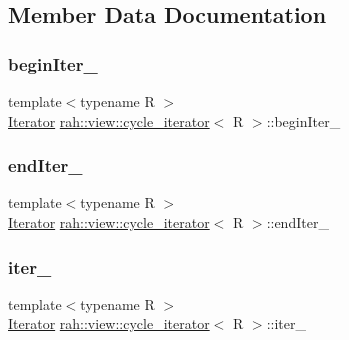 \subsection{Member Data Documentation}
\mbox{\label{structrah_1_1view_1_1cycle__iterator_a1daddc1b5ce6e1203aecb236a04d11d6}} 
\subsubsection{\texorpdfstring{beginIter\_}{beginIter\_}}
{\footnotesize\ttfamily template$<$typename R $>$ \\
\mbox{\hyperlink{structrah_1_1view_1_1cycle__iterator_ac9761016862e6bb26b0ca5e923344b83}{Iterator}} \mbox{\hyperlink{structrah_1_1view_1_1cycle__iterator}{rah\+::view\+::cycle\+\_\+iterator}}$<$ R $>$\+::begin\+Iter\+\_\+}

\mbox{\label{structrah_1_1view_1_1cycle__iterator_ac2b991834504ffc79a0d477588a4668e}} 
\subsubsection{\texorpdfstring{endIter\_}{endIter\_}}
{\footnotesize\ttfamily template$<$typename R $>$ \\
\mbox{\hyperlink{structrah_1_1view_1_1cycle__iterator_ac9761016862e6bb26b0ca5e923344b83}{Iterator}} \mbox{\hyperlink{structrah_1_1view_1_1cycle__iterator}{rah\+::view\+::cycle\+\_\+iterator}}$<$ R $>$\+::end\+Iter\+\_\+}

\mbox{\label{structrah_1_1view_1_1cycle__iterator_a49dea5baf32f7e9bc237b6f534513ada}} 
\subsubsection{\texorpdfstring{iter\_}{iter\_}}
{\footnotesize\ttfamily template$<$typename R $>$ \\
\mbox{\hyperlink{structrah_1_1view_1_1cycle__iterator_ac9761016862e6bb26b0ca5e923344b83}{Iterator}} \mbox{\hyperlink{structrah_1_1view_1_1cycle__iterator}{rah\+::view\+::cycle\+\_\+iterator}}$<$ R $>$\+::iter\+\_\+}

